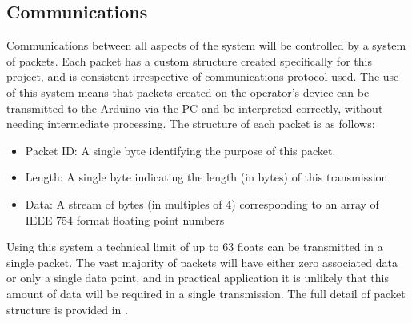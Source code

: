 \documentclass[main.tex]{subfiles}
\begin{document}
\subsection{Communications}
Communications between all aspects of the system will be controlled by a system of packets. Each packet has a custom structure created specifically for this project, and is consistent irrespective of communications protocol used. The use of this system means that packets created on the operator’s device can be transmitted to the Arduino via the PC and be interpreted correctly, without needing intermediate processing. The structure of each packet is as follows:
\begin{itemize}
\item Packet ID: A single byte identifying the purpose of this packet.
\item Length: A single byte indicating the length (in bytes) of this transmission
\item Data: A stream of bytes (in multiples of 4) corresponding to an array of IEEE 754 format floating point numbers
\end{itemize}
Using this system a technical limit of up to 63 floats can be transmitted in a single packet. The vast majority of packets will have either zero associated data or only a single data point, and in practical application it is unlikely that this amount of data will be required in a single transmission. The full detail of packet structure is provided in . 
\end{document}
